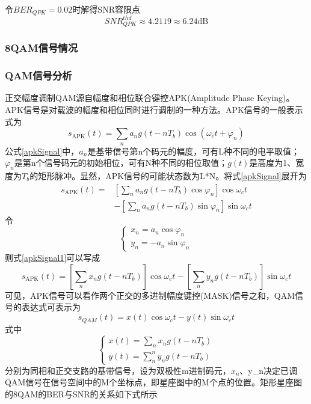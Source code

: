 \documentclass[bwprint]{gmcmthesis}
\numberwithin{equation}{section}
\begin{document}
令$B E R_{Q P K}=0.02$时解得SNR容限点
\begin{equation}
S N R_{Q P K}^{t h d} \approx 4.2119 \approx 6.24 \mathrm{dB}
\end{equation}

\subsubsection{8QAM信号情况}

\subsubsection*{QAM信号分析}

正交幅度调制QAM源自幅度和相位联合键控APK(Amplitude Phase Keying)。APK信号是对载波的幅度和相位同时进行调制的一种方法。APK信号的一般表示式为
\begin{equation}
s_{\mathrm{APK}}(t)=\sum_{n} a_{n} g\left(t-n T_{b}\right) \cos \left(\omega_{c} t+\varphi_{n}\right)\label{apkSignal}
\end{equation}
公式\ref{apkSignal}中，$a_{n}$是基带信号第n个码元的幅度，可有L种不同的电平取值；$\varphi_{n}$是第n个信号码元的初始相位，可有N种不同的相位取值；$g(t)$是高度为1、宽度为$T_{b}$的矩形脉冲。显然，APK信号的可能状态数为L*N。将式\ref{apkSignal}展开为
\begin{equation}
\begin{aligned}
s_{\mathrm{APK}}(t)=&\left[\sum_{n} a_{n} g\left(t-n T_{b}\right) \cos \varphi_{n}\right] \cos \omega_{c} t \\ &-\left[\sum_{n} a_{n} g\left(t-n T_{b}\right) \sin \varphi_{n}\right] \sin \omega_{c} t
\end{aligned}
\end{equation}
令
\begin{equation}
\left\{\begin{array}{l}{x_{n}=a_{n} \cos \varphi_{n}} \\ {y_{n}=-a_{n} \sin \varphi_{n}}\end{array}\right.\label{apkSignal1}
\end{equation}
则式\ref{apkSignal1}可以写成
\begin{equation}
s_{\mathrm{APK}}(t)=\left[\sum_{n} x_{n} g\left(t-n T_{b}\right)\right] \cos \omega_{c} t-\left[\sum_{n} y_{n} g\left(t-n T_{b}\right)\right] \sin \omega_{c} t
\end{equation}
可见，APK信号可以看作两个正交的多进制幅度键控(MASK)信号之和，QAM信号的表达式可表示为
\begin{equation}
s_{Q A M}(t)=x(t) \cos \omega_{c} t-y(t) \sin \omega_{c} t
\end{equation}
式中
\begin{equation}
\left\{\begin{array}{l}{x(t)=\sum_{n} x_{n} g\left(t-n T_{b}\right)} \\ {y(t)=\sum_{n}^{n} y_{n} g\left(t-n T_{b}\right)}\end{array}\right.
\end{equation}
分别为同相和正交支路的基带信号，设为双极性m进制码元，$x_{n}$、y_n决定已调QAM信号在信号空间中的M个坐标点，即星座图中的M个点的位置。矩形星座图的8QAM的BER与SNR的关系如下式所示
\end{document}
